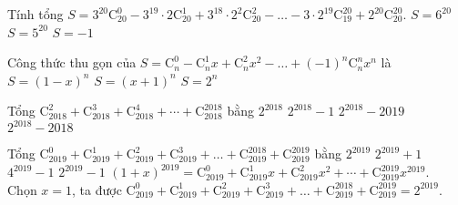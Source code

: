\begin{ex}%
Tính tổng $S = 3^{20}\mathrm{C}_{20}^0-3^{19}\cdot 2\mathrm{C}_{20}^1+3^{18}\cdot 2^2\mathrm{C}_{20}^2-\ldots -3\cdot 2^{19}\mathrm{C}_{19}^{20}+2^{20}\mathrm{C}_{20}^{20}.$
{$S= 6^{20}$}
{$S = 5^{20} $}
{$S=-1 $}
\loigiai{
\[ 1=(3-2)^{20}=3^{20}\mathrm{C}_{20}^0-3^{19}\cdot 2\mathrm{C}_{20}^1+3^{18}\cdot 2^2\mathrm{C}_{20}^2-\ldots -3\cdot 2^{19}\mathrm{C}_{19}^{20}+2^{20}\mathrm{C}_{20}^{20}. \]
}
\end{ex}
\begin{ex}%
Công thức thu gọn của $S = \mathrm{C}_{n}^0-\mathrm{C}_{n}^1x+\mathrm{C}_{n}^2x^2-\ldots +(-1)^n\mathrm{C}_{n}^{n}x^{n}$ là
{\True $S=(1-x)^n $}
{$S=(x+1)^n $}
{$S=2^n $}
\end{ex}

\begin{ex}%
Tổng $\mathrm{C}_{2018}^{2}+\mathrm{C}_{2018}^{3}+\mathrm{C}_{2018}^{4}+\cdots+\mathrm{C}_{2018}^{2018}$ bằng
\choice
{$2^{2018}$}
{$2^{2018}-1$}
{\True $2^{2018}-2019$}
{$2^{2018}-2018$}
\end{ex}

\begin{ex}%
Tổng $\mathrm{C}_{2019}^0 + \mathrm{C}_{2019}^1 + \mathrm{C}_{2019}^2 + \mathrm{C}_{2019}^3 + \ldots + \mathrm{C}_{2019}^{2018} + \mathrm{C}_{2019}^{2019}$ bằng
\choice
{\True $2^{2019}$}
{$2^{2019}+1$}
{$4^{2019}-1$}
{$2^{2019}-1$}
\loigiai
{
$(1+x)^{2019}=\mathrm{C}_{2019}^0+\mathrm{C}_{2019}^1x+\mathrm{C}_{2019}^2x^2+\cdots+\mathrm{C}_{2019}^{2019}x^{2019}$.\\
Chọn $x=1$, ta được $\mathrm{C}_{2019}^0 + \mathrm{C}_{2019}^1 + \mathrm{C}_{2019}^2 + \mathrm{C}_{2019}^3 + \ldots + \mathrm{C}_{2019}^{2018} + \mathrm{C}_{2019}^{2019}=2^{2019}$.
}
\end{ex}

